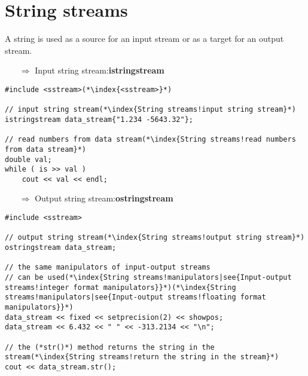 \documentclass[10pt]{article}
\begin{document}
\section{String streams}
\small
A string is used as a source for an input stream or as a target for an output stream. \\
\begin{enumerate}
\item[$\Rightarrow$] Input string stream:\textbf{istringstream}
\end{enumerate}
\begin{lstlisting}
#include <sstream>(*\index{<sstream>}*)

// input string stream(*\index{String streams!input string stream}*)
istringstream data_stream{"1.234 -5643.32"};

// read numbers from data stream(*\index{String streams!read numbers from data stream}*)
double val;
while ( is >> val )
    cout << val << endl;
\end{lstlisting}
\begin{enumerate}
\item[$\Rightarrow$] Output string stream:\textbf{ostringstream}
\end{enumerate}
\begin{lstlisting}
#include <sstream>

// output string stream(*\index{String streams!output string stream}*)
ostringstream data_stream;

// the same manipulators of input-output streams
// can be used(*\index{String streams!manipulators|see{Input-output streams!integer format manipulators}}*)(*\index{String streams!manipulators|see{Input-output streams!floating format manipulators}}*)
data_stream << fixed << setprecision(2) << showpos;
data_stream << 6.432 << " " << -313.2134 << "\n";

// the (*str()*) method returns the string in the stream(*\index{String streams!return the string in the stream}*)
cout << data_stream.str();
\end{lstlisting}
%
%
\end{document}
